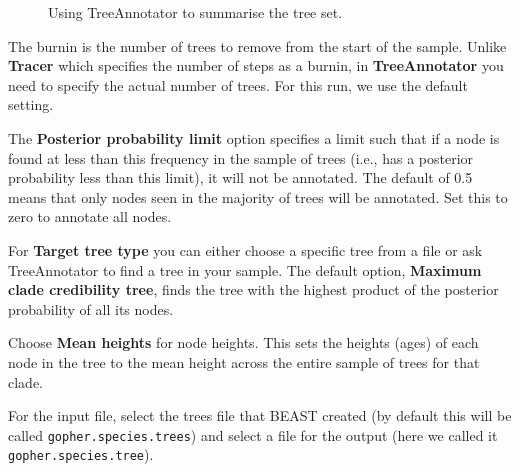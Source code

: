 \documentclass{article}
\begin{document}
\begin{figure}
\begin{center}


\end{center}
\caption{\label{fig.TreeAnnotator} Using TreeAnnotator to summarise the tree set.}
\end{figure}


The burnin is the number of trees to remove from the start of the sample. Unlike {\bf Tracer} which specifies the number of steps as a burnin, in {\bf TreeAnnotator} you need to specify the actual number of trees. For this run, we use the default setting.

The {\bf Posterior probability limit} option specifies a limit such that if a node is found at less than this frequency in the sample of trees (i.e., has a posterior probability less than this limit), it will not be annotated. The default of 0.5 means that only nodes seen in the majority of trees will be annotated. Set this to zero to annotate all nodes.

For {\bf Target tree type} you can either choose a specific tree from a file or ask TreeAnnotator to find a tree in your sample. The default option, {\bf Maximum clade credibility tree}, finds the tree with the highest product of the posterior probability of all its nodes.

Choose {\bf Mean heights} for node heights. This sets the heights (ages) of each node in the tree to the mean height across the entire sample of trees for that clade.

For the input file, select the trees file that BEAST created (by default this will be called \texttt{gopher.species.trees}) and select a file for the output (here we called it \texttt{gopher.species.tree}).
\end{document}
